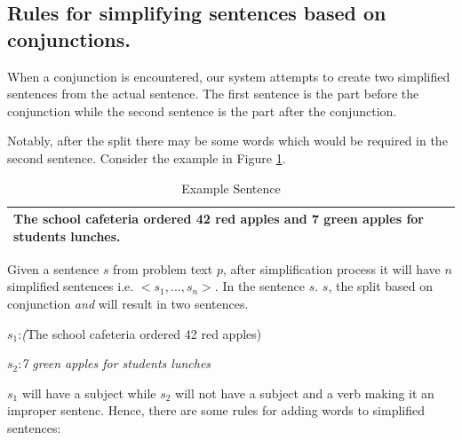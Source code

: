 \documentclass[11pt]{article}
\begin{document}
\subsection{Rules for simplifying sentences based on conjunctions.}\label{sec:simplifyingrules}
 When a conjunction is encountered, our system attempts to create two simplified sentences from the actual sentence. The first sentence is the part before the conjunction while the second sentence is the part after the conjunction.

Notably, after the split there may be some words which would be required in the second sentence. Consider the example in Figure \ref{figure:8}.

\begin{table}[h!]
\centering
\begin{tabular}{ | m{25em} | }
\hline
The school cafeteria ordered 42 red apples and 7 green apples for students lunches.\\
\hline
\end{tabular}
\caption{Example Sentence}
\label{figure:8}
\end{table}

Given a sentence \begin{math}s\end{math} from problem text \begin{math}p\end{math}, after simplification process it will have  \begin{math}n\end{math} simplified sentences i.e. \begin{math}<s_{1},..., s_{n}>\end{math}. In the sentence  \begin{math}s\end{math}. \begin{math}s\end{math}, the split based on conjunction \textit{and} will result in two sentences. 

\begin{math}s_{1}\end{math}:\textit(The school cafeteria ordered 42 red apples)

\begin{math}s_{2}\end{math}:\textit{7 green apples for students lunches}


\begin{math}s_{1}\end{math} will have a subject while \begin{math}s_{2}\end{math} will not have a subject and a verb making it an improper sentenc. Hence, there are some rules for adding words to simplified sentences:
\end{document}
